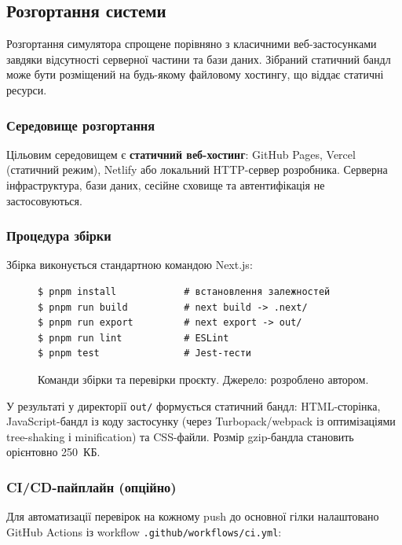 \subsection{Розгортання системи}

Розгортання симулятора спрощене порівняно з класичними
веб-застосунками завдяки відсутності серверної частини та бази
даних. Зібраний статичний бандл може бути розміщений на будь-якому
файловому хостингу, що віддає статичні ресурси.

\subsubsection*{Середовище розгортання}

Цільовим середовищем є \textbf{статичний веб-хостинг}: GitHub Pages,
Vercel (статичний режим), Netlify або локальний HTTP-сервер
розробника. Серверна інфраструктура, бази даних, сесійне сховище
та автентифікація не застосовуються.

\subsubsection*{Процедура збірки}

Збірка виконується стандартною командою Next.js:

\begin{figure}[H]
\begin{verbatim}
$ pnpm install            # встановлення залежностей
$ pnpm run build          # next build -> .next/
$ pnpm run export         # next export -> out/
$ pnpm run lint           # ESLint
$ pnpm test               # Jest-тести
\end{verbatim}
\caption{Команди збірки та перевірки проєкту. Джерело: розроблено
         автором.}
\label{lst:build}
\end{figure}

У результаті у директорії \texttt{out/} формується статичний
бандл: HTML-сторінка, JavaScript-бандл із коду застосунку (через
Turbopack/webpack із оптимізаціями tree-shaking і minification) та
CSS-файли. Розмір gzip-бандла становить орієнтовно 250~КБ.

\subsubsection*{CI/CD-пайплайн (опційно)}

Для автоматизації перевірок на кожному push до основної гілки
налаштовано GitHub Actions із workflow \texttt{.github/workflows/ci.yml}:

